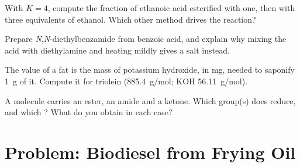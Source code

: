 \begin{exercise}[$\star\star$]\label{exo:b2:acyl-substitution:9}
With $K = 4$, compute the fraction of ethanoic acid esterified with one, then with three
equivalents of ethanol. Which other method drives the reaction?
\end{exercise}

\begin{exercise}[$\star\star\star$]\label{exo:b2:acyl-substitution:10}
Prepare \textit{N},\textit{N}-diethylbenzamide from benzoic acid, and explain why mixing the acid
with diethylamine and heating mildly gives a salt instead.
\end{exercise}

\begin{exercise}[$\star\star\star$]\label{exo:b2:acyl-substitution:11}
The  value of a fat is the mass of potassium hydroxide, in mg, needed to saponify
\qty{1}{g} of it. Compute it for triolein (\qty{885.4}{g/mol}; KOH \qty{56.11}{g/mol}).
\end{exercise}

\begin{exercise}[$\star\star\star$]\label{exo:b2:acyl-substitution:12}
A molecule carries an ester, an amide and a ketone. Which group(s) does  reduce, and which
? What do you obtain in each case?
\end{exercise}

\section{Problem: Biodiesel from Frying Oil}

